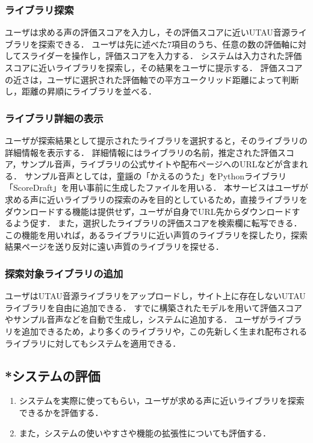 \documentclass[a4j,8pt,twocolumn]{extarticle}
\begin{document}
\subsubsection{ライブラリ探索}
ユーザは求める声の評価スコアを入力し，その評価スコアに近いUTAU音源ライブラリを探索できる．
ユーザは先に述べた7項目のうち、任意の数の評価軸に対してスライダーを操作し，評価スコアを入力する．
システムは入力された評価スコアに近いライブラリを探索し，その結果をユーザに提示する．
評価スコアの近さは，ユーザに選択された評価軸での平方ユークリッド距離によって判断し，距離の昇順にライブラリを並べる．

\subsubsection{ライブラリ詳細の表示}
ユーザが探索結果として提示されたライブラリを選択すると，そのライブラリの詳細情報を表示する．
詳細情報にはライブラリの名前，推定された評価スコア，サンプル音声，ライブラリの公式サイトや配布ページへのURLなどが含まれる．
サンプル音声としては，童謡の「かえるのうた」をPythonライブラリ「ScoreDraft」を用い事前に生成したファイルを用いる．
本サービスはユーザが求める声に近いライブラリの探索のみを目的としているため，直接ライブラリをダウンロードする機能は提供せず，ユーザが自身でURL先からダウンロードするよう促す．
また，選択したライブラリの評価スコアを検索欄に転写できる．
この機能を用いれば，あるライブラリに近い声質のライブラリを探したり，探索結果ページを送り反対に遠い声質のライブラリを探せる．

\subsubsection{探索対象ライブラリの追加}
ユーザはUTAU音源ライブラリをアップロードし，サイト上に存在しないUTAUライブラリを自由に追加できる．
すでに構築されたモデルを用いて評価スコアやサンプル音声などを自動で生成し，システムに追加する．
ユーザがライブラリを追加できるため，より多くのライブラリや，この先新しく生まれ配布されるライブラリに対してもシステムを適用できる．

\subsection{*システムの評価}
\begin{enumerate}
  \item システムを実際に使ってもらい，ユーザが求める声に近いライブラリを探索できるかを評価する．
  \item また，システムの使いやすさや機能の拡張性についても評価する．
\end{enumerate}
\end{document}
